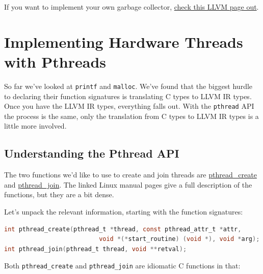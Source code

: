 If you want to implement your own garbage collector,
\href{https://llvm.org/docs/GarbageCollection.html}{check this LLVM page
out}.

\hypertarget{implementing-hardware-threads-with-pthreads}{%
\section{\texorpdfstring{\protect\hyperlink{implementing-hardware-threads-with-pthreads}{}Implementing
Hardware Threads with
Pthreads}{Implementing Hardware Threads with Pthreads}}\label{implementing-hardware-threads-with-pthreads}}

So far we've looked at \texttt{printf} and \texttt{malloc}. We've found
that the biggest hurdle to declaring their function signatures is
translating C types to LLVM IR types. Once you have the LLVM IR types,
everything falls out. With the \texttt{pthread} API the process is the
same, only the translation from C types to LLVM IR types is a little
more involved.

\hypertarget{understanding-the-pthread-api}{%
\subsection{\texorpdfstring{\protect\hyperlink{understanding-the-pthread-api}{}Understanding
the Pthread
API}{Understanding the Pthread API}}\label{understanding-the-pthread-api}}

The two functions we'd like to use to create and join threads are
\href{https://man7.org/linux/man-pages/man3/pthread_create.3.html}{pthread\_create}
and
\href{https://man7.org/linux/man-pages/man3/pthread_join.3.html}{pthread\_join}.
The linked Linux manual pages give a full description of the functions,
but they are a bit dense.

Let's unpack the relevant information, starting with the function
signatures:


\begin{lstlisting}[language=C]
int pthread_create(pthread_t *thread, const pthread_attr_t *attr,
                          void *(*start_routine) (void *), void *arg);
int pthread_join(pthread_t thread, void **retval);
\end{lstlisting}

Both \texttt{pthread\_create} and \texttt{pthread\_join} are idiomatic C
functions in that:

